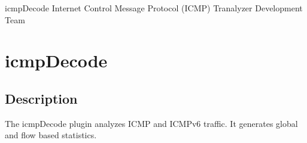 \documentclass[documentation]{subfiles}
\begin{document}
\trantitle
    {icmpDecode}
    {Internet Control Message Protocol (ICMP)}
    {Tranalyzer Development Team} %

\section{icmpDecode}\label{s:icmpDecode}

\subsection{Description}
The icmpDecode plugin analyzes ICMP and ICMPv6 traffic.
It generates global and flow based statistics.

%
%
%
\end{document}
